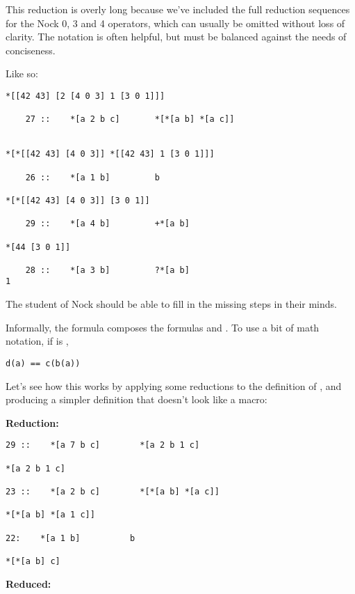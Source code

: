 This reduction is overly long because we've included the full reduction sequences for the Nock 0, 3 and 4 operators, which can usually be omitted without loss of clarity. The notation is often helpful, but must be balanced against the needs of conciseness. 

Like so:

\begin{framed_shaded}
\begin{Verbatim}[fontsize=\relsize{-2.5},fontseries=b,commandchars=\\\{\}]
*[[42 43] [2 [4 0 3] 1 [3 0 1]]]

    27 ::    *[a 2 b c]       *[*[a b] *[a c]]


*[*[[42 43] [4 0 3]] *[[42 43] 1 [3 0 1]]]

    26 ::    *[a 1 b]         b

*[*[[42 43] [4 0 3]] [3 0 1]]

    29 ::    *[a 4 b]         +*[a b]

*[44 [3 0 1]]

    28 ::    *[a 3 b]         ?*[a b]
1
\end{Verbatim}
\end{framed_shaded}
The student of Nock should be able to fill in the missing steps in their minds.

Informally, the formula \kode{[7 b c]} composes the formulas  and
.  To use a bit of math notation, if  is \kode{[7 b c]},

\begin{framed_shaded}
\begin{Verbatim}[fontsize=\relsize{-2.5},fontseries=b,commandchars=\\\{\}]
d(a) == c(b(a))
\end{Verbatim}
\end{framed_shaded}
Let's see how this works by applying some reductions to the
definition of , and producing a simpler definition that
doesn't look like a macro:

\textbf{ Reduction:}

\begin{framed_shaded}
\begin{Verbatim}[fontsize=\relsize{-2.5},fontseries=b,commandchars=\\\{\}]
29 ::    *[a 7 b c]        *[a 2 b 1 c]

*[a 2 b 1 c]

23 ::    *[a 2 b c]        *[*[a b] *[a c]] 

*[*[a b] *[a 1 c]]

22:    *[a 1 b]          b
 
*[*[a b] c]
\end{Verbatim}
\end{framed_shaded}
\textbf{ Reduced:}

